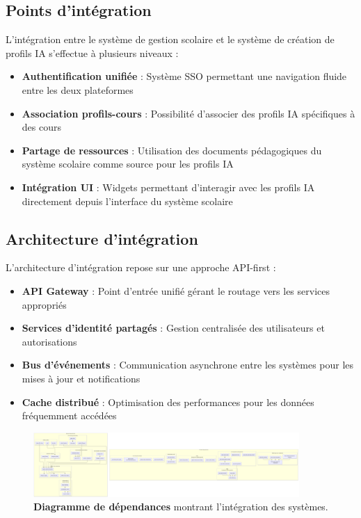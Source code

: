 \subsection{Points d'intégration}

L'intégration entre le système de gestion scolaire et le système de création de profils IA s'effectue à plusieurs niveaux :

\begin{itemize}
  \item \textbf{Authentification unifiée} : Système SSO permettant une navigation fluide entre les deux plateformes
  
  \item \textbf{Association profils-cours} : Possibilité d'associer des profils IA spécifiques à des cours
  
  \item \textbf{Partage de ressources} : Utilisation des documents pédagogiques du système scolaire comme source pour les profils IA
  
  \item \textbf{Intégration UI} : Widgets permettant d'interagir avec les profils IA directement depuis l'interface du système scolaire
\end{itemize}

\subsection{Architecture d'intégration}

L'architecture d'intégration repose sur une approche API-first :

\begin{itemize}
  \item \textbf{API Gateway} : Point d'entrée unifié gérant le routage vers les services appropriés
  
  \item \textbf{Services d'identité partagés} : Gestion centralisée des utilisateurs et autorisations
  
  \item \textbf{Bus d'événements} : Communication asynchrone entre les systèmes pour les mises à jour et notifications
  
  \item \textbf{Cache distribué} : Optimisation des performances pour les données fréquemment accédées
\end{itemize}

\begin{figure}[H]
  \centering
  \includegraphics[width=0.9\textwidth,keepaspectratio]{pfe-pics/diagrames/dependeces.png}
  \caption{\textbf{Diagramme de dépendances} montrant l'intégration des systèmes.}
  \label{fig:integration_dependencies}
\end{figure}

